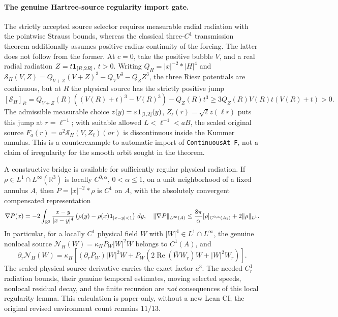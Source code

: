 \paragraph{The genuine Hartree-source regularity import gate.}
The strictly accepted source selector requires measurable radial radiation with
the pointwise Strauss bounds, whereas the classical three-\(C^1\) transmission
theorem additionally assumes positive-radius continuity of the forcing.
The latter does not follow from the former. At \(c=0\), take the positive
bubble \(V\), and a real radial radiation \(Z=t{\bf1}_{[R,2R]}\), \(t>0\).
Writing \(Q_H=|x|^{-2}*|H|^4\) and
\(\mathcal S_H(V,Z)=Q_{V+Z}(V+Z)^3-Q_VV^3-Q_ZZ^3\),
the three Riesz potentials are continuous, but at \(R\) the physical
source has the strictly positive jump
\[
 [\mathcal S_H]_R
 =Q_{V+Z}(R)((V(R)+t)^3-V(R)^3)-Q_Z(R)t^3
 \ge 3Q_Z(R)V(R)t(V(R)+t)>0.
\]
The admissible measurable choice \(z(y)=\varepsilon{\bf1}_{[1,2]}(y)\),
\(Z_\ell(r)=\sqrt\ell z(\ell r)\) puts this jump at \(r=\ell^{-1}\);
with suitable allowed \(L<\ell^{-1}<aB\), the scaled original source
\(F_a(r)=a^2\mathcal S_H(V,Z_\ell)(ar)\) is discontinuous inside the
Kummer annulus. This is a counterexample to automatic import of
\texttt{ContinuousAt F}, not a claim of irregularity for the smooth
orbit sought in the theorem.

A constructive bridge is available for sufficiently regular physical
radiation. If \(\rho\in L^1\cap L^\infty(\mathbb R^3)\) is locally
\(C^{0,\alpha}\), \(0<\alpha\le1\), on a unit neighborhood of a fixed
annulus \(A\), then \(P=|x|^{-2}*\rho\) is \(C^1\) on \(A\), with the
absolutely convergent compensated representation
\[
 \nabla P(x)=-2\int_{\mathbb R^3}
   \frac{x-y}{|x-y|^4}
   \left(\rho(y)-\rho(x){\bf1}_{|x-y|<1}\right)\,dy,
 \quad
 \|\nabla P\|_{L^\infty(A)}
 \le \frac{8\pi}{\alpha}[\rho]_{C^{0,\alpha}(A_1)}
       +2\|\rho\|_{L^1}.
\]
In particular, for a locally \(C^1\) physical field \(W\) with
\(|W|^4\in L^1\cap L^\infty\), the genuine nonlocal source
\(\mathcal N_H(W)=\kappa_H P_W|W|^2W\) belongs to \(C^1(A)\), and
\[
 \partial_r\mathcal N_H(W)=\kappa_H\left[
  (\partial_rP_W)|W|^2W+
  P_W\left(2\operatorname{Re}(\bar WW_r)W+|W|^2W_r\right)
 \right].
\]
The scaled physical source derivative carries the exact factor \(a^3\).
The needed \(C^1_r\) radiation bounds, their genuine temporal estimates,
moving selected speeds, nonlocal residual decay, and the finite recursion
are \emph{not} consequences of this local regularity lemma. This
calculation is paper-only, without a new Lean CI; the original revised
environment count remains \(11/13\).
